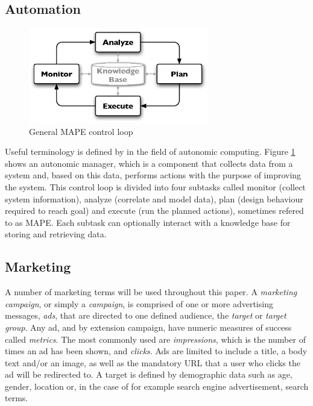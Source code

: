 \documentclass[a4paper]{article}
\begin{document}
\subsection{Automation}
\begin{figure}[htb] \centering \includegraphics[width=0.7\textwidth]{mape.eps}
	\caption{General MAPE control loop}
	\label{fig:MAPE}
\end{figure}

Useful terminology is defined by \citet{IBM2006} in the field of autonomic computing. Figure \ref{fig:MAPE} shows an autonomic manager, which is a component that collects data from a system and, based on this data, performs actions with the purpose of improving the system. This control loop is divided into four subtasks called monitor (collect system information), analyze (correlate and model data), plan (design behaviour required to reach goal) and execute (run the planned actions), sometimes refered to as MAPE. Each subtask can optionally interact with a knowledge base for storing and retrieving data.

\subsection{Marketing}
A number of marketing terms will be used throughout this paper. A \emph{marketing campaign}, or simply a \emph{campaign}, is comprised of one or more advertising messages, \emph{ads}, that are directed to one defined audience, the \emph{target} or  \emph{target group}. Any ad, and by extension campaign, have numeric measures of success called \emph{metrics}. The most commonly used are \emph{impressions}, which is the number of times an ad has been shown, and \emph{clicks}. Ads are limited to include a  title, a body text and/or an image, as well as the mandatory URL that a user who clicks the ad will be redirected to. A target is defined by demographic data such as age, gender, location or, in the case of for example search engine advertisement, search terms.
\end{document}
